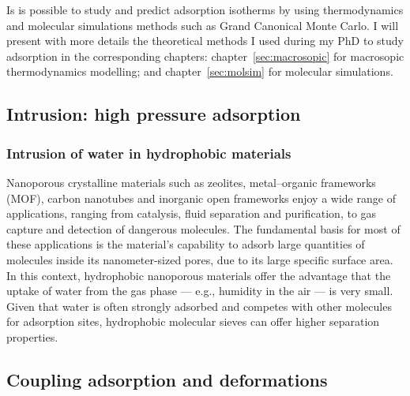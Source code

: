 \documentclass[thesis]{subfiles}
\begin{document}
Is is possible to study and predict adsorption isotherms by using thermodynamics
and molecular simulations methods such as Grand Canonical Monte Carlo. I will
present with more details the theoretical methods I used during my PhD to study
adsorption in the corresponding chapters: chapter~\ref{sec:macrosopic} for
macrosopic thermodynamics modelling; and chapter~\ref{sec:molsim} for molecular
simulations.

\subsection{Intrusion: high pressure adsorption}


\subsubsection{Intrusion of water in hydrophobic materials}

Nanoporous crystalline materials such as zeolites, metal--organic frameworks
(MOF), carbon nanotubes and inorganic open frameworks enjoy a wide range of
applications, ranging from catalysis, fluid separation and purification, to gas
capture and detection of dangerous molecules. The fundamental basis for most of
these applications is the material's capability to adsorb large quantities of
molecules inside its nanometer-sized pores, due to its large specific surface
area. In this context, hydrophobic nanoporous materials offer the advantage that
the uptake of water from the gas phase --- e.g., humidity in the air --- is very
small\cite{Wu2010, Ghosh2014, Wang2016}. Given that water is often strongly
adsorbed and competes with other molecules for adsorption sites, hydrophobic
molecular sieves can offer higher separation properties\cite{Flanigen1978,
Giaya2000}.

\subsection{Coupling adsorption and deformations}


\OnlyInSubfile{\printbibliography}
\end{document}
